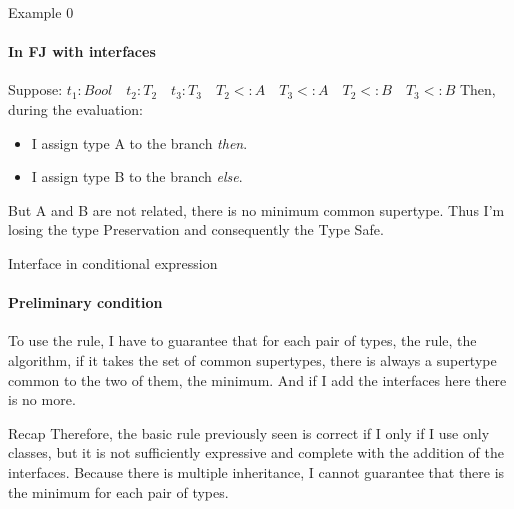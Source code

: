 \documentclass{beamer}
\begin{document}
\begin{frame}{Example 0}
    \framesubtitle{In FJ with interfaces}
Suppose: $t_1 : Bool \quad t_2 : T_2 \quad t_3 : T_3 \quad T_2 <:A \quad T_3 <: A \quad T_2 <: B \quad T_3 <: B$
Then, during the evaluation:
\begin{itemize}
    \item I assign type A to the branch \textit{then}.
    \item I assign type B to the branch \textit{else}.
\end{itemize}
But A and B are not related, there is no minimum common supertype. Thus I'm losing the type Preservation and consequently the Type Safe.

\begin{center}
\end{center}
 \end{frame}

\begin{frame}{Interface in conditional expression}
\framesubtitle{Preliminary condition}
    To use the rule, I have to guarantee that for each pair of types, the rule, the algorithm, if it takes the set of common supertypes, there is always a supertype common to the two of them, the minimum.\newline
And if I add the interfaces here there is no more.
\end{frame}
\begin{frame}{Recap}
Therefore, the basic rule previously seen is correct if I only if I use only classes, but it is not sufficiently expressive and complete with the addition of the interfaces.\newline\newline
Because there is multiple inheritance, I cannot guarantee that there is the minimum for each pair of types.
    
\end{frame}
\end{document}
